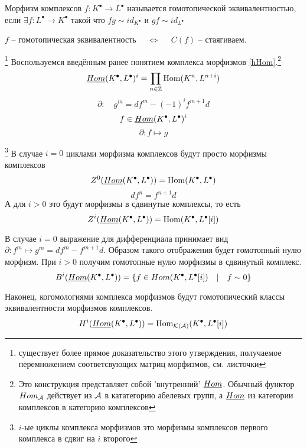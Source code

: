\documentclass[../main.tex]{subfiles}
\begin{document}
\begin{to_def}
    Морфизм комплексов $f\colon K^\bullet \to L^\bullet$ называется гомотопической эквивалентностью, если $\exists f\colon L^\bullet \to K^\bullet$ такой что $fg \sim id_{K^\bullet}$ и $gf\sim id_{L^\bullet}$
\end{to_def}
\begin{to_suj}
\label{hom_eq_con}
 $f$ -- гомотопическая эквивалентность $\quad \Leftrightarrow \quad$ $C(f)$ -- стаягиваем.
\end{to_suj}\footnote{существует более прямое доказательство этого утверждения, получаемое перемножением соответсвующих матриц морфизмов, см. листочки}
    Воспользуемся введённым ранее понятием комплекса морфизмов \ref{hHom}.\footnote{Это конструкция представляет собой 'внутренний' $\underline{Hom}$. Обычный функтор $Hom_{\mathcal{A}}$ действует из $\mathcal{A}$ в кататегорию абелевых групп, а $\underline{Hom}$ из категории комплексов в категорию комплексов} 
    \[\underline{Hom} (K^\bullet, L^\bullet)^{i} = \prod_{n\in \mathbb{Z}}\operatorname{Hom}(K^n, L^{n+i})\]
    \[\partial\colon \quad g^m = df^m - (-1)^if^{m+1}d\]
    \[f\in \underline{Hom}(K^\bullet, L^\bullet)^i\]
    \[\partial\colon f \mapsto g\]
\begin{to_com}\footnote{$i$-ые циклы комплекса морфизмов это морфизмы комплексов первого комплекса в сдвиг на $i$ второго}
    В случае $i=0$ циклами морфизма комплексов будут просто морфизмы комплексов 
    \[
        Z^0 (\underline{Hom}(K^\bullet, L^\bullet)) = \operatorname{Hom}(K^\bullet, L^\bullet)
    \]
    \[
    df^n = f^{n+1}d
    \]
    А для $i>0$ это будут морфизмы в сдвинутые комплексы, то есть 
    \[
    Z^i (\underline{Hom}(K^\bullet, L^\bullet)) = \operatorname{Hom}(K^\bullet, L^\bullet[i])
    \]
\end{to_com}
\begin{to_com}
    В случае $i=0$ выражение для дифференциала принимает вид $\partial\colon f^m\mapsto g^m = df^m - f^{m+1}d$. Образом такого отображения будет гомотопный нулю морфизм. При $i>0$ получим гомотопные нулю морфизмы в сдвинутый комплекс.
    \[
        B^i (\underline{Hom}(K^\bullet, L^\bullet)) = \lbrace f\in Hom(K^\bullet, L^\bullet[i])\quad|\quad f\sim 0 \rbrace
    \]
\end{to_com}
\begin{to_com}\label{cohomology_comp_mor}
Наконец, когомологиями комплекса морфизмов будут гомотопический классы эквивалентности морфизмов комплексов.
\[
H^i (\underline{Hom}(K^\bullet, L^\bullet)) = \operatorname{Hom}_{\mathcal{K(A)}}(K^\bullet, L^\bullet[i])
\]
\end{to_com}
\end{document}
